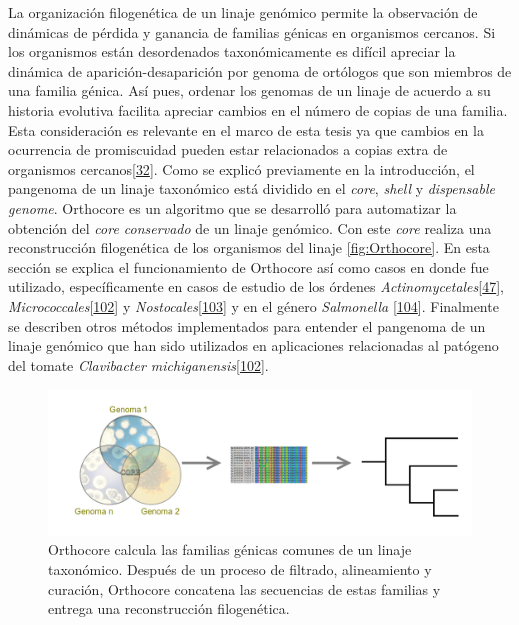 \documentclass[12pt,twoside]{reedthesis}
\begin{document}
  La organización filogenética de un linaje genómico permite la
  observación de dinámicas de pérdida y ganancia de familias génicas en
  organismos cercanos. Si los organismos están desordenados
  taxonómicamente es difícil apreciar la dinámica de
  aparición-desaparición por genoma de ortólogos que son miembros de una
  familia génica. Así pues, ordenar los genomas de un linaje de acuerdo a
  su historia evolutiva facilita apreciar cambios en el número de copias
  de una familia. Esta consideración es relevante en el marco de esta
  tesis ya que cambios en la ocurrencia de promiscuidad pueden estar
  relacionados a copias extra de organismos
  cercanos{[}\protect\hyperlink{ref-verdel-aranda_molecular_2015}{32}{]}.
  Como se explicó previamente en la introducción, el pangenoma de un
  linaje taxonómico está dividido en el \emph{core}, \emph{shell} y
  \emph{dispensable} \emph{genome}. Orthocore es un algoritmo que se
  desarrolló para automatizar la obtención del \emph{core conservado} de
  un linaje genómico. Con este \emph{core} realiza una reconstrucción
  filogenética de los organismos del linaje \autoref{fig:Orthocore}. En
  esta sección se explica el funcionamiento de Orthocore así como casos en
  donde fue utilizado, específicamente en casos de estudio de los órdenes
  \emph{Actinomycetales}{[}\protect\hyperlink{ref-juarez-vazquez_evolution_2017}{47}{]},
  \emph{Micrococcales}{[}\protect\hyperlink{ref-rodriguez_tesis_2016}{102}{]}
  y
  \emph{Nostocales}{[}\protect\hyperlink{ref-gutierrez-garcia_cycad_2019}{103}{]}
  y en el género \emph{Salmonella}
  {[}\protect\hyperlink{ref-delgado-suarez_whole_2018}{104}{]}. Finalmente
  se describen otros métodos implementados para entender el pangenoma de
  un linaje genómico que han sido utilizados en aplicaciones relacionadas
  al patógeno del tomate \emph{Clavibacter
  michiganensis}{[}\protect\hyperlink{ref-rodriguez_tesis_2016}{102}{]}.
  
  \begin{figure}[h!tbp]
  \centering
  \includegraphics[angle = 0,scale = .44]{chapter1/coreWiki.png}
  \caption[Orthocore calcula el $core~genome$ de un linaje y construye con él una filogenia]{\footnotesize{Orthocore calcula las familias génicas comunes de un linaje taxonómico. Después de un proceso de filtrado, alineamiento y curación, Orthocore concatena las secuencias de estas familias y entrega una reconstrucción filogenética.}}
  \label{fig:Orthocore}
  \end{figure}
  
\end{document}
